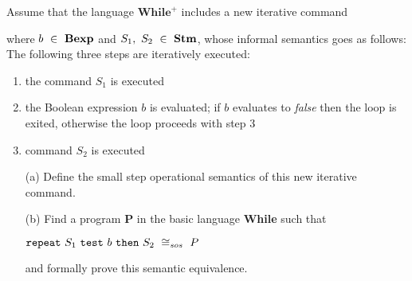 {
	Assume that the language $\textbf{While}^{\textbf{+}}$ includes a new
	iterative command
	\begin{center}
	\end{center}
	where $b~\in~\mbox{\textbf{Bexp}}$ and $S_1,~S_2~\in~\mbox{\textbf{Stm}}$, whose informal semantics goes
	as follows:\\The following three steps are iteratively executed:
	\begin{enumerate}
	\item the command $S_1$ is executed
	\item the Boolean expression $b$ is evaluated; if $b$ evaluates to 
	\emph{false} then the loop is exited, otherwise the loop proceeds with step
	3
	\item command $S_2$ is executed
	\end{enumerate}
	\begin{itemize}
	\item [(a)] Define the small step operational semantics of this new
	iterative command.
	\item [(b)] Find a program \textbf{P} in the basic language \textbf{While} such that
	\begin{center}
	$\texttt{repeat}~S_1~\texttt{test}~b~\texttt{then}~S_2~\cong_{sos}~P$
	\end{center}
	and formally prove this semantic equivalence.
	\end{itemize}
}
